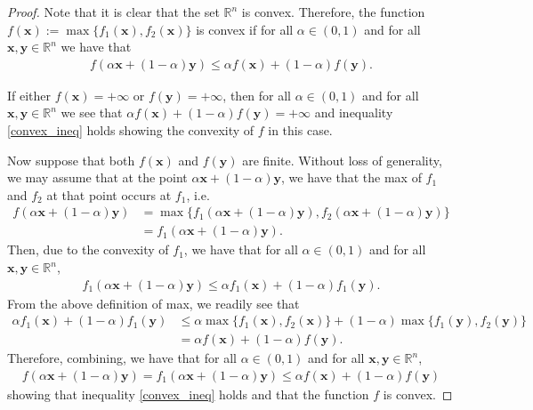 \documentclass[12pt]{article}
\theoremstyle{definition}
\newcommand{\vc}[1]{\boldsymbol{#1}}
\begin{document}
\begin{proof}
  Note that it is clear that the set $\mathbb{R}^n$ is convex. Therefore, the
  function $f(\vc{x}) := \max\{f_1(\vc{x}), f_2(\vc{x})\}$ is convex if for all
  $\alpha \in (0, 1)$ and for all $\vc{x}, \vc{y} \in \mathbb{R}^n$ we have that
  \begin{align}\label{convex_ineq}
    f(\alpha\vc{x} + (1-\alpha)\vc{y}) \leq \alpha f(\vc{x}) + (1-\alpha)f(\vc{y}).
  \end{align}

  If either $f(\vc{x}) = +\infty$ or $f(\vc{y}) = +\infty$, then for all
  $\alpha \in (0, 1)$ and for all $\vc{x}, \vc{y} \in \mathbb{R}^n$ we see that
  $\alpha f(\vc{x}) + (1-\alpha)f(\vc{y}) = + \infty$ and inequality \eqref{convex_ineq}
  holds showing the convexity of $f$ in this case.

  Now suppose that both $f(\vc{x})$ and $f(\vc{y})$ are finite. Without loss of generality,
  we may assume that at the point $\alpha\vc{x} + (1-\alpha)\vc{y}$, we have that
  the max of $f_1$ and $f_2$ at that point occurs at $f_1$, i.e.\
  \begin{align*}
    f(\alpha\vc{x} + (1-\alpha)\vc{y})
    &= \max\{f_1(\alpha\vc{x} + (1-\alpha)\vc{y}), f_2(\alpha\vc{x} + (1-\alpha)\vc{y})\} \\
    &= f_1(\alpha\vc{x} + (1-\alpha)\vc{y}).
  \end{align*}
  Then, due to the convexity of $f_1$, we have that for all $\alpha \in (0, 1)$ and for all $\vc{x}, \vc{y} \in \mathbb{R}^n$,
  \begin{align*}
    f_1(\alpha\vc{x} + (1-\alpha)\vc{y}) \leq \alpha f_1(\vc{x}) + (1-\alpha)f_1(\vc{y}).
  \end{align*}
  From the above definition of max, we readily see that
  \begin{align*}
    \alpha f_1(\vc{x}) + (1-\alpha)f_1(\vc{y})
    &\leq \alpha \max\{f_1(\vc{x}), f_2(\vc{x})\} + (1-\alpha)\max\{f_1(\vc{y}), f_2(\vc{y})\} \\
    &=\alpha f(\vc{x}) + (1-\alpha) f(\vc{y}).
  \end{align*}
  Therefore, combining, we have that for all $\alpha \in (0, 1)$ and for all $\vc{x}, \vc{y} \in \mathbb{R}^n$,
  \begin{align*}
    f(\alpha\vc{x} + (1-\alpha)\vc{y}) = f_1(\alpha\vc{x} + (1-\alpha)\vc{y}) \leq \alpha f(\vc{x}) + (1-\alpha) f(\vc{y})
  \end{align*}
  showing that inequality \eqref{convex_ineq} holds and that the function $f$ is convex.
\end{proof}
\newpage
\end{document}
